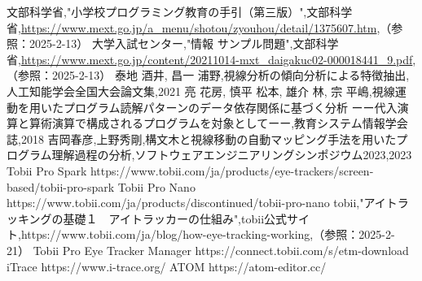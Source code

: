 \documentclass[paper=a4paper,fontsize=11pt]{jlreq}
\begin{document}
\pagebreak

\begin{thebibliography}{99}
   文部科学省,"小学校プログラミング教育の手引（第三版）",文部科学省,\url{https://www.mext.go.jp/a_menu/shotou/zyouhou/detail/1375607.htm},（参照：2025-2-13）
   大学入試センター,"情報 サンプル問題",文部科学省,\url{https://www.mext.go.jp/content/20211014-mxt_daigakuc02-000018441_9.pdf},（参照：2025-2-13）
   泰地 酒井, 昌一 浦野,視線分析の傾向分析による特徴抽出,人工知能学会全国大会論文集,2021
   亮 花房, 慎平 松本, 雄介 林, 宗 平嶋,視線運動を用いたプログラム読解パターンのデータ依存関係に基づく分析
  ーー代入演算と算術演算で構成されるプログラムを対象としてーー,教育システム情報学会誌,2018
   吉岡春彦,上野秀剛,構文木と視線移動の自動マッピング手法を用いたプログラム理解過程の分析,ソフトウェアエンジニアリングシンポジウム2023,2023
   Tobii Pro Spark https://www.tobii.com/ja/products/eye-trackers/screen-based/tobii-pro-spark
   Tobii Pro Nano https://www.tobii.com/ja/products/discontinued/tobii-pro-nano
   tobii,"アイトラッキングの基礎１　アイトラッカーの仕組み",tobii公式サイト,https://www.tobii.com/ja/blog/how-eye-tracking-working,（参照：2025-2-21）
   Tobii Pro Eye Tracker Manager https://connect.tobii.com/s/etm-download
   iTrace https://www.i-trace.org/
   ATOM https://atom-editor.cc/
\end{thebibliography}
\end{document}
